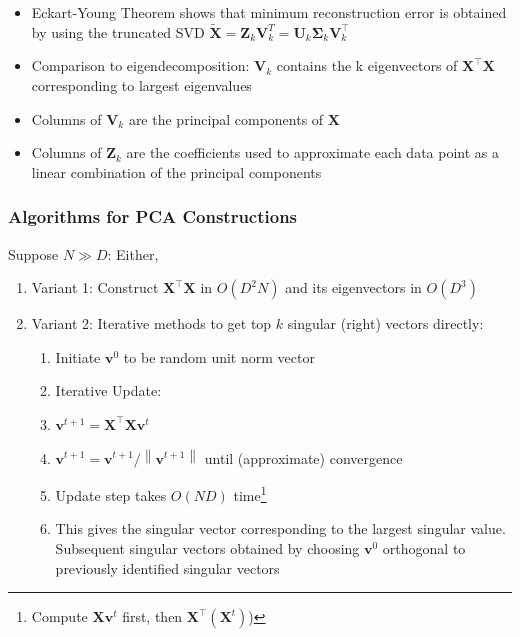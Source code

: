 \documentclass[11pt, %
	oneside, %
	english, %
	onehalfspacing, %
	parskip, %
	]{article} %
\theoremstyle{definition}
\begin{document}
\begin{itemize}
	\item Eckart-Young Theorem shows that minimum reconstruction error is obtained by using the truncated SVD $\mathbf{\tilde{X}} = \mathbf{Z}_k \mathbf{V}_k^T =\mathbf{U}_k \boldsymbol{\Sigma}_k \mathbf{V}_k^{\top}$
	\item Comparison to eigendecomposition: $\mathbf{V}_k$ contains the k eigenvectors of $\mathbf{X}^\top \mathbf{X}$ corresponding to largest eigenvalues
	\item Columns of $\mathbf{V}_k$ are the principal components of $\mathbf{X}$
	\item Columns of $\mathbf{Z}_k$ are the coefficients used to approximate each data point as a linear combination of the principal components
\end{itemize}


\subsubsection*{Algorithms for PCA Constructions}

Suppose $N \gg D$: Either,

\begin{enumerate}
	\item Variant 1: Construct $\mathbf{X}^{\top} \mathbf{X}$ in $O\left(D^2 N\right)$ and its eigenvectors in $O\left(D^3\right)$
	\item Variant 2: Iterative methods to get top $k$ singular (right) vectors directly:
	\begin{enumerate}
		\item Initiate $\mathbf{v}^0$ to be random unit norm vector
		\item Iterative Update:
		\item $\mathbf{v}^{t+1}=\mathbf{X}^{\top} \mathbf{X} \mathbf{v}^t$
		\item $\mathbf{v}^{t+1}=\mathbf{v}^{t+1} /\left\|\mathbf{v}^{t+1}\right\|$
		until (approximate) convergence
		\item Update step takes $O(N D)$ time\footnote{Compute $\mathbf{X} \mathbf{v}^t$ first, then $\mathbf{X}^{\top}\left(\mathbf{X}^t\right)$)}
		\item This gives the singular vector corresponding to the largest singular value. Subsequent singular vectors obtained by choosing $\mathbf{v}^0$ orthogonal to previously identified singular vectors
	\end{enumerate}
\end{enumerate}
\end{document}
